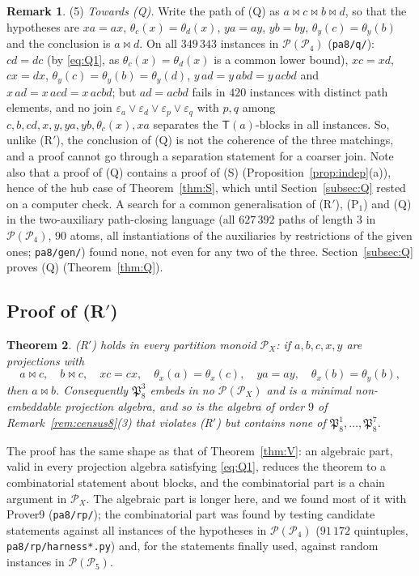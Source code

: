 \documentclass[11pt]{amsart}
\newtheorem{theorem}{Theorem}[section]
\theoremstyle{definition}
\newtheorem{remark}[theorem]{Remark}
\renewcommand{\P}{\mathcal{P}}
\newcommand{\T}{\mathsf{T}}
\newcommand{\mt}{\bowtie}   %
\begin{document}
\begin{remark}
 (5) \emph{Towards (Q).} Write the path of (Q) as $a\mt c\mt b\mt d$, so that the hypotheses are $xa=ax$, $\theta_c(x)=\theta_d(x)$, $ya=ay$, $yb=by$, $\theta_y(c)=\theta_y(b)$ and the conclusion is $a\mt d$. On all $349\,343$ instances in $\P(\P_4)$ (\texttt{pa8/q/}): $cd=dc$ (by \eqref{eq:Q1}, as $\theta_c(x)=\theta_d(x)$ is a common lower bound), $xc=xd$, $cx=dx$, $\theta_y(c)=\theta_y(b)=\theta_y(d)$, $y\,ad=y\,abd=y\,acbd$ and $x\,ad=x\,acd=x\,acbd$; but $ad=acbd$ fails in $420$ instances with distinct path elements, and no join $\varepsilon_a\vee\varepsilon_d\vee\varepsilon_p\vee\varepsilon_q$ with $p,q$ among $c,b,cd,x,y,ya,yb,\theta_c(x),xa$ separates the $\T(a)$-blocks in all instances. So, unlike (R$'$), the conclusion of (Q) is not the coherence of the three matchings, and a proof cannot go through a separation statement for a coarser join. Note also that a proof of (Q) contains a proof of (S) (Proposition~\ref{prop:indep}(a)), hence of the hub case of Theorem~\ref{thm:S}, which until Section~\ref{subsec:Q} rested on a computer check. A search for a common generalisation of (R$'$), (P$_1$) and (Q) in the two-auxiliary path-closing language (all $627\,392$ paths of length $3$ in $\P(\P_4)$, $90$ atoms, all instantiations of the auxiliaries by restrictions of the given ones; \texttt{pa8/gen/}) found none, not even for any two of the three. Section~\ref{subsec:Q} proves (Q) (Theorem~\ref{thm:Q}).
\end{remark}


\subsection{Proof of (R$'$)}\label{subsec:Rp}

\begin{theorem}\label{thm:Rp}
(R$'$) holds in every partition monoid $\P_X$: if $a,b,c,x,y$ are projections with
\[
a\mt c,\quad b\mt c,\quad xc=cx,\quad \theta_x(a)=\theta_x(c),\quad ya=ay,\quad \theta_x(b)=\theta_y(b),
\]
then $a\mt b$. Consequently $\mathfrak P_8^3$ embeds in no $\P(\P_X)$ and is a minimal non-embeddable projection algebra, and so is the algebra of order $9$ of Remark~\ref{rem:census8}(3) that violates (R$'$) but contains none of $\mathfrak P_8^1,\dots,\mathfrak P_8^7$.
\end{theorem}

The proof has the same shape as that of Theorem~\ref{thm:V}: an algebraic part, valid in every projection algebra satisfying \eqref{eq:Q1}, reduces the theorem to a combinatorial statement about blocks, and the combinatorial part is a chain argument in $\P_X$. The algebraic part is longer here, and we found most of it with Prover9 (\texttt{pa8/rp/}); the combinatorial part was found by testing candidate statements against all instances of the hypotheses in $\P(\P_4)$ ($91\,172$ quintuples, \texttt{pa8/rp/harness*.py}) and, for the statements finally used, against random instances in $\P(\P_5)$.
\end{document}
